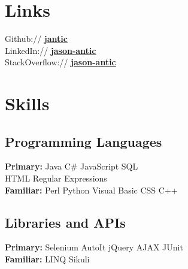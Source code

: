 \documentclass[letterpaper]{deedy-resume} %
\begin{document}
\begin{minipage}[t]{0.33\textwidth}
\sectionspace %


\section{Links} 

Github:// \href{https://github.com/jantic}{\bf jantic} \\
LinkedIn:// \href{https://www.linkedin.com/pub/jason-antic/98/406/739}{\bf jason-antic} \\
StackOverflow:// \href{http://stackoverflow.com/users/1535248/jason-antic}{\bf jason-antic} 

\sectionspace %

\section{Skills}

\subsection{Programming Languages}
\textbf{Primary:}\newline 
Java \textbullet{} C\# \textbullet{} JavaScript \textbullet{} SQL \\
HTML \textbullet{} Regular Expressions \\ 
\textbf{Familiar:}\newline 
Perl \textbullet{} Python \textbullet{} Visual Basic \textbullet{} CSS \textbullet{} C++ \\

\sectionspace %

\subsection{Libraries and APIs}

\textbf{Primary:}\newline 
Selenium \textbullet{} AutoIt \textbullet{} jQuery \newline AJAX \textbullet{} JUnit \\ 
\textbf{Familiar:}\newline 
LINQ \textbullet{} Sikuli \\


\end{minipage}
\end{document}
